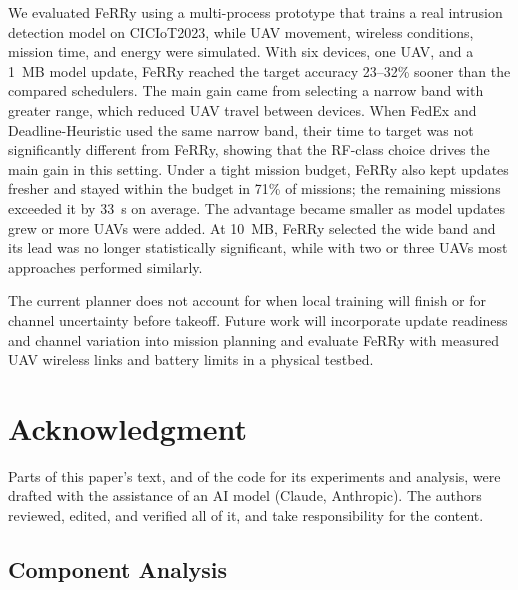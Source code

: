 \documentclass[conference]{IEEEtran}
\newcommand{\sysname}{FeRRy}
\begin{document}
We evaluated \sysname{} using a multi-process prototype that trains a real
intrusion detection model on CICIoT2023, while UAV movement, wireless
conditions, mission time, and energy were simulated. With six devices, one UAV,
and a 1~MB model update, \sysname{} reached the target accuracy 23--32\% sooner
than the compared schedulers. The main gain came from selecting a narrow band
with greater range, which reduced UAV travel between devices. When FedEx and
Deadline-Heuristic used the same narrow band, their time to target was not
significantly different from \sysname{}, showing that the RF-class choice
drives the main gain in this setting. Under a tight mission budget, \sysname{}
also kept updates fresher and stayed within the budget in 71\% of missions; the
remaining missions exceeded it by 33~s on average. The advantage became smaller
as model updates grew or more UAVs were added. At 10~MB, \sysname{} selected
the wide band and its lead was no longer statistically significant, while with
two or three UAVs most approaches performed similarly.

The current planner does not account for when local training will finish or for
channel uncertainty before takeoff. Future work will incorporate update
readiness and channel variation into mission planning and evaluate \sysname{}
with measured UAV wireless links and battery limits in a physical testbed.

\section*{Acknowledgment}
Parts of this paper's text, and of the code for its experiments and analysis,
were drafted with the assistance of an AI model (Claude, Anthropic). The authors
reviewed, edited, and verified all of it, and take responsibility for the
content.




\appendix
\label{app:evaluation}

\subsection{Component Analysis}
\label{app:components}
\end{document}
